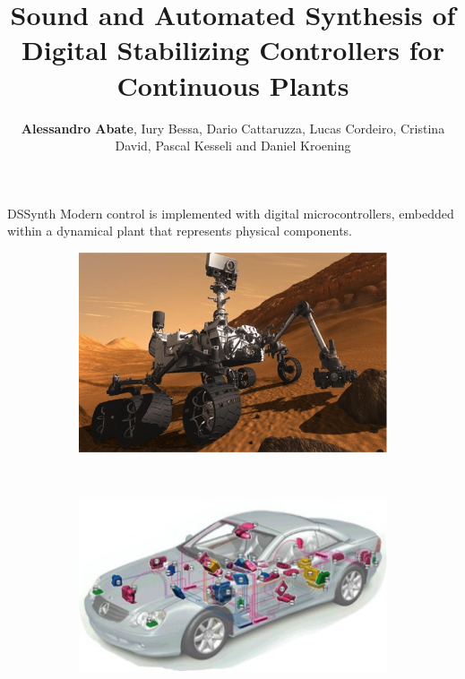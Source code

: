 \documentclass{beamer}
\newcommand\tool{{\sf DSSynth}\xspace}
\begin{document}
\title {Sound and Automated Synthesis of Digital
Stabilizing Controllers for Continuous Plants}

\author{\textbf{Alessandro Abate}, Iury Bessa, Dario Cattaruzza, Lucas Cordeiro, Cristina David, Pascal Kesseli and Daniel Kroening}

\frame{\maketitle}

\begin{frame}{\tool}
%
Modern control is implemented with digital microcontrollers, embedded within
a dynamical plant that represents physical components.
\begin{figure}
    \centering
    \begin{subfigure}[b]{0.3\textwidth}
        \includegraphics[width=\textwidth]{figures/step1_figureB.png}
    \end{subfigure}
    ~
    \begin{subfigure}[b]{0.3\textwidth}
        \includegraphics[width=\textwidth]{figures/step1_figureC.png}

\end{subfigure}
\end{figure}
\end{frame}
\end{document}
